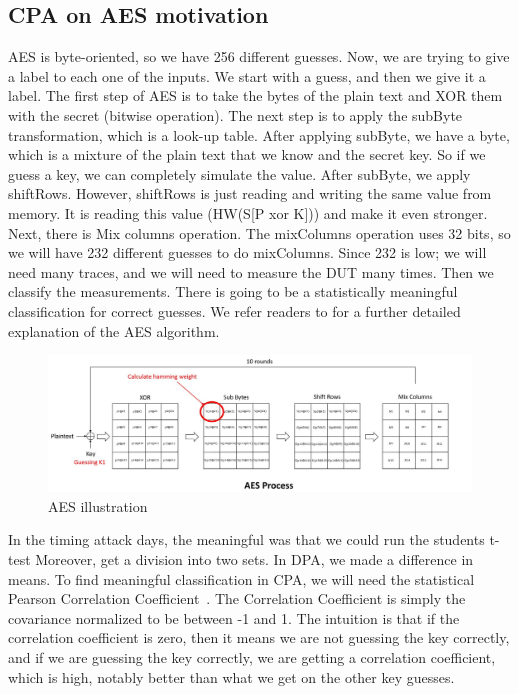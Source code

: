 \subsection{CPA on AES motivation}

AES \cite{anderson1998serpent} is byte-oriented, so we have 256 different guesses. Now, we are trying to
give a label to each one of the inputs. We start with a guess, and then we give it
a label. The first step of AES is to take the bytes of the plain text and XOR
them with the secret (bitwise operation). The next step is to apply the subByte
transformation, which is a look-up table. After applying subByte, we
have a byte, which is a mixture of the plain text that we know and the secret key. So if we guess a key, we can completely simulate the value. After
subByte, we apply shiftRows. However, shiftRows is just reading and writing the same
value from memory. It is reading this value (HW(S[P xor K])) and make it
even stronger. Next, there is Mix columns operation. The mixColumns operation
uses 32 bits, so we will have 232 different guesses to do mixColumns. Since 232
is low; we will need many traces, and we will need to measure the DUT many times. Then we classify the measurements. There is going to be a statistically
meaningful classification for correct guesses. We refer readers to \cite{AESDescription} 
for a further detailed explanation of the AES algorithm.

\begin{figure}[!ht]
    \centering
    \includegraphics[width=1.0\textwidth]{images/chapter8/aes_process.jpg}
    \caption{AES illustration} \label{c8_aes:fig}
\end{figure}

In the timing attack days, the meaningful was that we could run the students t-test
Moreover, get a division into two sets. In DPA, we made a difference in means. To find
meaningful classification in CPA, we will need the statistical Pearson
Correlation Coefficient~\cite{PearsonCorrelationCoefficient}. The Correlation
Coefficient is simply the covariance normalized to be between -1 and 1. The
intuition is that if the correlation coefficient is zero, then it means we are
not guessing the key correctly, and if we are guessing the key correctly, we are
getting a correlation coefficient, which is high, notably better than what we get
on the other key guesses. 

